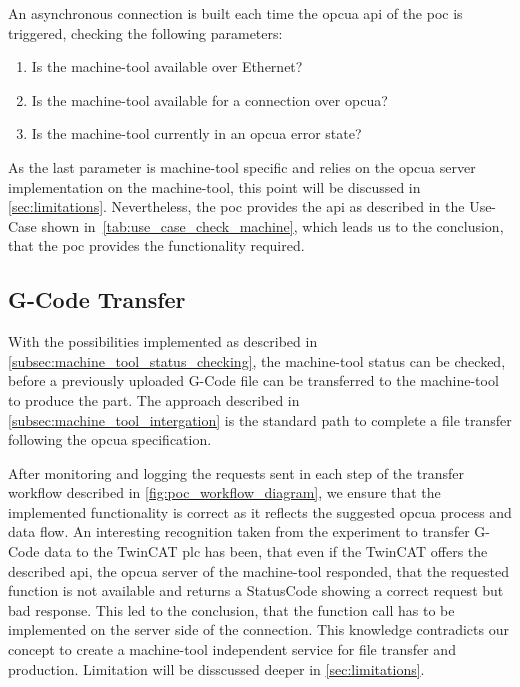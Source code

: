 \documentclass[
a4paper,
twoside,
headsepline,
cleardoublepage=empty,
parskip=half,
draft=false
]{scrbook}
\begin{document}
				An asynchronous connection is built each time the \gls{opcua} \gls{api} of the \gls{poc} is triggered, checking the following parameters:

				\begin{enumerate}
					\item Is the machine-tool available over Ethernet?
					\item Is the machine-tool available for a connection over \gls{opcua}?
					\item Is the machine-tool currently in an \gls{opcua} error state?
				\end{enumerate}

				As the last parameter is machine-tool specific and relies on the \gls{opcua} server implementation on the machine-tool, this point will be discussed in \cref{sec:limitations}. Nevertheless, the \gls{poc} provides the \gls{api} as described in the Use-Case shown in~\cref{tab:use_case_check_machine}, which leads us to the conclusion, that the \gls{poc} provides the functionality required.

			\subsection{G-Code Transfer}\label{subsec:g_code_transfer}

				With the possibilities implemented as described in \cref{subsec:machine_tool_status_checking}, the machine-tool status can be checked, before a previously uploaded G-Code file can be transferred to the machine-tool to produce the part. The approach described in \cref{subsec:machine_tool_intergation} is the standard path to complete a file transfer following the \gls{opcua} specification.

				After monitoring and logging the requests sent in each step of the transfer workflow described in \cref{fig:poc_workflow_diagram}, we ensure that the implemented functionality is correct as it reflects the suggested \gls{opcua} process and data flow. An interesting recognition taken from the experiment to transfer G-Code data to the TwinCAT \gls{plc} has been, that even if the TwinCAT offers the described \gls{api}, the \gls{opcua} server of the machine-tool responded, that the requested function is not available and returns a StatusCode showing a correct request but bad response. This led to the conclusion, that the function call has to be implemented on the server side of the connection. This knowledge contradicts our concept to create a machine-tool independent service for file transfer and production. Limitation will be disscussed deeper in \cref{sec:limitations}.
\end{document}
